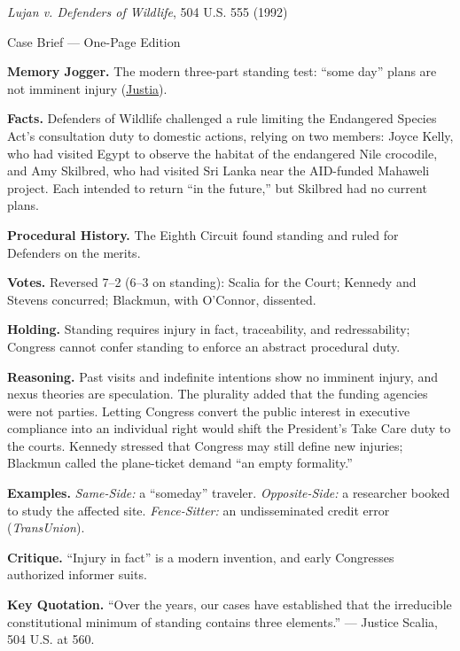 \documentclass[12pt]{article}
\begin{document}
\begin{center}
{\Large \textit{Lujan v. Defenders of Wildlife}, 504 U.S. 555 (1992)\par}
\vspace{0.3em}
{\normalsize Case Brief --- One-Page Edition\par}
\end{center}

\textbf{Memory Jogger.} The modern three-part standing test: ``some day'' plans are not imminent injury (\href{https://supreme.justia.com/cases/federal/us/504/555/}{Justia}).

\textbf{Facts.} Defenders of Wildlife challenged a rule limiting the Endangered Species Act's consultation duty to domestic actions, relying on two members: Joyce Kelly, who had visited Egypt to observe the habitat of the endangered Nile crocodile, and Amy Skilbred, who had visited Sri Lanka near the AID-funded Mahaweli project. Each intended to return ``in the future,'' but Skilbred had no current plans.

\textbf{Procedural History.} The Eighth Circuit found standing and ruled for Defenders on the merits.

\textbf{Votes.} Reversed 7--2 (6--3 on standing): Scalia for the Court; Kennedy and Stevens concurred; Blackmun, with O'Connor, dissented.

\textbf{Holding.} Standing requires injury in fact, traceability, and redressability; Congress cannot confer standing to enforce an abstract procedural duty.

\textbf{Reasoning.} Past visits and indefinite intentions show no imminent injury, and nexus theories are speculation. The plurality added that the funding agencies were not parties. Letting Congress convert the public interest in executive compliance into an individual right would shift the President's Take Care duty to the courts. Kennedy stressed that Congress may still define new injuries; Blackmun called the plane-ticket demand ``an empty formality.''

\textbf{Examples.} \emph{Same-Side:} a ``someday'' traveler. \emph{Opposite-Side:} a researcher booked to study the affected site. \emph{Fence-Sitter:} an undisseminated credit error (\textit{TransUnion}).

\textbf{Critique.} ``Injury in fact'' is a modern invention, and early Congresses authorized informer suits.

\textbf{Key Quotation.} ``Over the years, our cases have established that the irreducible constitutional minimum of standing contains three elements.'' --- Justice Scalia, 504 U.S. at 560.
\end{document}
